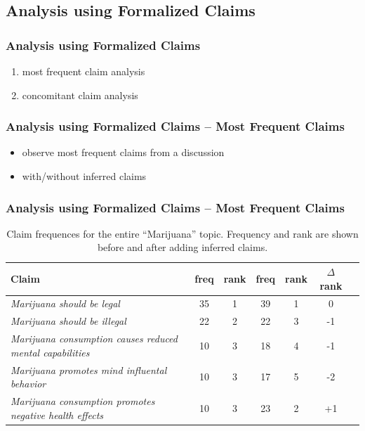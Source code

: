 \documentclass{beamer}
\begin{document}
\subsection{Analysis using Formalized Claims}

\begin{frame}
	\frametitle{Analysis using Formalized Claims}
	\begin{enumerate}
		\item most frequent claim analysis
			\vspace{1cm}
		\item concomitant claim analysis
	\end{enumerate}
\end{frame}

\begin{frame}
	\frametitle{Analysis using Formalized Claims -- Most Frequent Claims}

	\begin{itemize}
		\item observe most frequent claims from a discussion
		\item with/without inferred claims
	\end{itemize}
\end{frame}

\begin{frame}
	\frametitle{Analysis using Formalized Claims -- Most Frequent Claims}

\begin{table}[t]
\centering

\renewcommand{\arraystretch}{1.5}%
\scriptsize
\begin{tabular}{p{4 cm} | cc | cc | cc}
	\toprule
	\textbf{Claim} & freq & rank & freq & rank & $\Delta$rank \\
\midrule
	\emph{Marijuana should be legal 				}& 35 & 1 & 39 & 1 & 0 \\
	\emph{Marijuana should be illegal 				}& 22 & 2 & 22 & 3 & -1 \\
	\emph{Marijuana consumption causes reduced mental capabilities} & 10 & 3 & 18 & 4 & -1 \\
	\emph{Marijuana promotes mind influental behavior 		}& 10 & 3 & 17 & 5 & -2 \\
	\emph{Marijuana consumption promotes negative health effects 	}& 10 & 3 & 23 & 2 & +1 \\
\bottomrule 
\end{tabular}
\caption{Claim frequences for the entire ``Marijuana'' topic. Frequency and rank are
	shown before and after adding inferred claims. }
\end{table}

\end{frame}
\end{document}
